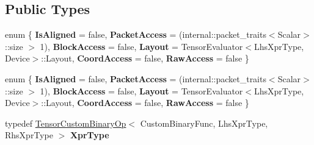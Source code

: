 \subsection*{Public Types}
\begin{DoxyCompactItemize}
\item 
\mbox{\label{struct_eigen_1_1_tensor_evaluator_3_01const_01_tensor_custom_binary_op_3_01_custom_binary_func_0fea6836b993af318b6a5ab54d775368f_a91da61b9597cd0ac175065e2b380a288}} 
enum \{ \newline
{\bfseries Is\+Aligned} = false, 
{\bfseries Packet\+Access} = (internal\+:\+:packet\+\_\+traits$<$Scalar$>$\+:\+:size $>$ 1), 
{\bfseries Block\+Access} = false, 
{\bfseries Layout} = Tensor\+Evaluator$<$Lhs\+Xpr\+Type, Device$>$\+:\+:Layout, 
\newline
{\bfseries Coord\+Access} = false, 
{\bfseries Raw\+Access} = false
 \}
\item 
\mbox{\label{struct_eigen_1_1_tensor_evaluator_3_01const_01_tensor_custom_binary_op_3_01_custom_binary_func_0fea6836b993af318b6a5ab54d775368f_a64a2d28392c084ef185e3d6f47fab308}} 
enum \{ \newline
{\bfseries Is\+Aligned} = false, 
{\bfseries Packet\+Access} = (internal\+:\+:packet\+\_\+traits$<$Scalar$>$\+:\+:size $>$ 1), 
{\bfseries Block\+Access} = false, 
{\bfseries Layout} = Tensor\+Evaluator$<$Lhs\+Xpr\+Type, Device$>$\+:\+:Layout, 
\newline
{\bfseries Coord\+Access} = false, 
{\bfseries Raw\+Access} = false
 \}
\item 
\mbox{\label{struct_eigen_1_1_tensor_evaluator_3_01const_01_tensor_custom_binary_op_3_01_custom_binary_func_0fea6836b993af318b6a5ab54d775368f_afb6c6e153324258902e879e24384e211}} 
typedef \hyperlink{class_eigen_1_1_tensor_custom_binary_op}{Tensor\+Custom\+Binary\+Op}$<$ Custom\+Binary\+Func, Lhs\+Xpr\+Type, Rhs\+Xpr\+Type $>$ {\bfseries Xpr\+Type}
\item 
\mbox{\label{struct_eigen_1_1_tensor_evaluator_3_01const_01_tensor_custom_binary_op_3_01_custom_binary_func_0fea6836b993af318b6a5ab54d775368f_a0f9d9cb6309e54bcd5145de6fa69dd5d}} 

\end{DoxyCompactItemize}
